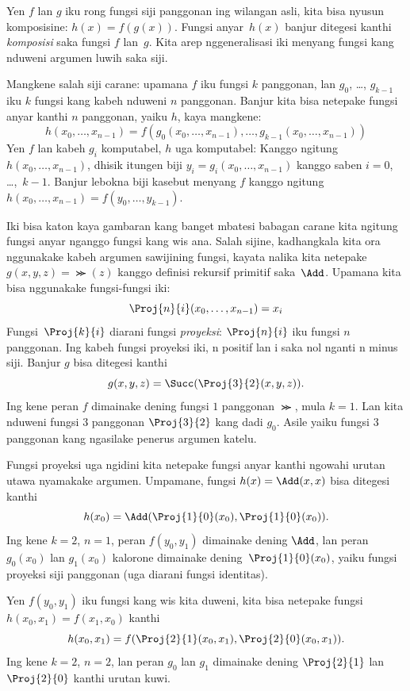 \documentclass[../../../include/open-logic-section]{subfiles}
\begin{document}

Yen $f$ lan $g$ iku rong fungsi siji panggonan ing wilangan asli,
kita bisa nyusun komposisine: $h(x) = f(g(x))$. Fungsi anyar~$h(x)$
banjur ditegesi kanthi \emph{komposisi} saka fungsi $f$ lan~$g$.
Kita arep nggeneralisasi iki menyang fungsi kang nduweni argumen
luwih saka siji.

Mangkene salah siji carane: upamana $f$ iku fungsi $k$ panggonan,
lan $g_0$, \dots, $g_{k-1}$ iku $k$ fungsi kang kabeh nduweni
$n$ panggonan. Banjur kita bisa netepake fungsi anyar
kanthi $n$ panggonan, yaiku $h$, kaya mangkene:
\[
h(x_0, \dots, x_{n-1}) =
f(g_0(x_0, \dots, x_{n-1}), \dots, g_{k-1}(x_0, \dots, x_{n-1}))
\]
Yen $f$ lan kabeh $g_i$ komputabel, $h$ uga komputabel:
Kanggo ngitung $h(x_0,
\dots, x_{n-1})$, dhisik itungen biji $y_i = g_i(x_0, \dots,
x_{n-1})$ kanggo saben $i = 0$, \dots,~$k-1$. Banjur
lebokna biji kasebut menyang $f$ kanggo ngitung
%
%
$h(x_0, \dots, x_{n-1}) = f(y_0, \dots, y_{k-1})$.

Iki bisa katon kaya gambaran kang banget mbatesi babagan
carane kita ngitung fungsi anyar nganggo fungsi kang wis ana.
Salah sijine, kadhangkala kita ora nggunakake kabeh argumen
sawijining fungsi, kayata nalika kita netepake
$g(x, y, z) = \Succ(z)$ kanggo definisi rekursif primitif
saka~$\Add$. Upamana kita bisa nggunakake fungsi-fungsi iki:
\[
\Proj{n}{i}(x_0, \dots, x_{n-1}) = x_i
\]
Fungsi~$\Proj{k}{i}$ diarani fungsi \emph{proyeksi}:
$\Proj{n}{i}$ iku fungsi $n$ panggonan. Ing kabeh fungsi proyeksi iki, n positif lan i saka nol nganti n minus siji. Banjur $g$
bisa ditegesi kanthi
\[
g(x, y, z) = \Succ(\Proj{3}{2}(x, y, z)).
\]
Ing kene peran $f$ dimainake dening fungsi $1$ panggonan
$\Succ$, mula $k=1$. Lan kita nduweni fungsi $3$ panggonan
$\Proj{3}{2}$ kang dadi $g_0$. Asile yaiku fungsi $3$
panggonan kang ngasilake penerus argumen katelu.

Fungsi proyeksi uga ngidini kita netepake fungsi anyar
kanthi ngowahi urutan utawa nyamakake argumen. Umpamane,
fungsi $h(x)
= \Add(x, x)$ bisa ditegesi kanthi
\[
h(x_0) = \Add(\Proj{1}{0}(x_0),\Proj{1}{0}(x_0)).
\]
Ing kene $k=2$, $n=1$, peran $f(y_0,y_1)$ dimainake
dening $\Add$, lan peran $g_0(x_0)$ lan $g_1(x_0)$
kalorone dimainake dening~$\Proj{1}{0}(x_0)$,
yaiku fungsi proyeksi siji panggonan (uga diarani
fungsi identitas).

Yen $f(y_0, y_1)$ iku fungsi kang wis kita duweni,
kita bisa netepake fungsi $h(x_0, x_1) = f(x_1, x_0)$
kanthi
\[
h(x_0, x_1) = f(\Proj{2}{1}(x_0, x_1),\Proj{2}{0}(x_0, x_1)).
\]
Ing kene $k=2$, $n = 2$, lan peran $g_0$ lan $g_1$
dimainake dening $\Proj{2}{1}$ lan~$\Proj{2}{0}$
kanthi urutan kuwi.
\end{document}
